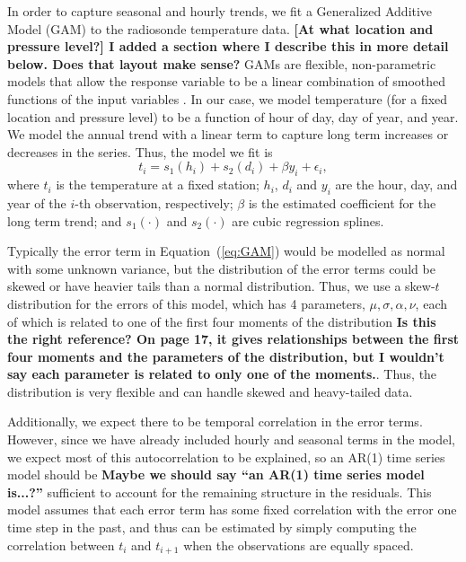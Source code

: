 \documentclass[12pt]{article}
\def\ni{\noindent}
\begin{document}
\begin{doublespacing}
In order to capture seasonal and hourly trends, we fit a Generalized Additive Model (GAM) to the radiosonde temperature data.  \textbf{[At what location and pressure level?]  I added a section where I describe this in more detail below.  Does that layout make sense?} GAMs are flexible, non-parametric models that allow the response variable to be a linear combination of smoothed functions of the input variables \cite{hastie90}.  In our case, we model temperature (for a fixed location and pressure level) to be a function of hour of day, day of year, and year.  We model the annual trend with a linear term to capture long term increases or decreases in the series.  Thus, the model we fit is
\begin{equation} \label{eq:GAM}
	t_i = s_1(h_i) + s_2(d_i) + \beta y_i + \epsilon_i,
\end{equation}
\ni where $t_i$ is the temperature at a fixed station; $h_i$, $d_i$ and $y_i$ are the hour, day, and year of the $i$-th observation, respectively; $\beta$ is the estimated coefficient for the long term trend; and $s_1(\cdot)$ and $s_2(\cdot)$ are cubic regression splines.

Typically the error term in Equation~(\ref{eq:GAM}) would be modelled as normal with some unknown variance, but the distribution of the error terms could be skewed or have heavier tails than a normal distribution.  Thus, we use a skew-$t$ distribution for the errors of this model, which has 4 parameters, $\mu, \sigma, \alpha, \nu$, each of which is related to one of the first four moments of the distribution \cite{azzalini03} \textbf{Is this the right reference?  On page 17, it gives relationships between the first four moments and the parameters of the distribution, but I wouldn't say each parameter is related to only one of the moments.}.  Thus, the distribution is very flexible and can handle skewed and heavy-tailed data.

Additionally, we expect there to be temporal correlation in the error terms.  However, since we have already included hourly and seasonal terms in the model, we expect most of this autocorrelation to be explained, so an AR(1) time series model should be \textbf{Maybe we should say ``an AR(1) time series model is...?''} sufficient to account for the remaining structure in the residuals.  This model assumes that each error term has some fixed correlation with the error one time step in the past, and thus can be estimated by simply computing the correlation between $t_i$ and $t_{i+1}$ when the observations are equally spaced.


\end{doublespacing}
\end{document}
